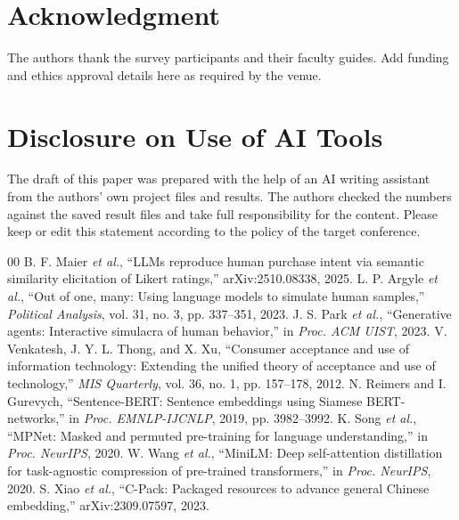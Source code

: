 \documentclass[conference]{IEEEtran}
\begin{document}
\section*{Acknowledgment}
The authors thank the survey participants and their faculty guides. Add funding and ethics approval details here as required by the venue.

\section*{Disclosure on Use of AI Tools}
The draft of this paper was prepared with the help of an AI writing assistant from the authors' own project files and results. The authors checked the numbers against the saved result files and take full responsibility for the content. Please keep or edit this statement according to the policy of the target conference.

\begin{thebibliography}{00}
 B. F. Maier \emph{et al.}, ``LLMs reproduce human purchase intent via semantic similarity elicitation of Likert ratings,'' arXiv:2510.08338, 2025.
 L. P. Argyle \emph{et al.}, ``Out of one, many: Using language models to simulate human samples,'' \emph{Political Analysis}, vol. 31, no. 3, pp. 337--351, 2023.
 J. S. Park \emph{et al.}, ``Generative agents: Interactive simulacra of human behavior,'' in \emph{Proc. ACM UIST}, 2023.
 V. Venkatesh, J. Y. L. Thong, and X. Xu, ``Consumer acceptance and use of information technology: Extending the unified theory of acceptance and use of technology,'' \emph{MIS Quarterly}, vol. 36, no. 1, pp. 157--178, 2012.
 N. Reimers and I. Gurevych, ``Sentence-BERT: Sentence embeddings using Siamese BERT-networks,'' in \emph{Proc. EMNLP-IJCNLP}, 2019, pp. 3982--3992.
 K. Song \emph{et al.}, ``MPNet: Masked and permuted pre-training for language understanding,'' in \emph{Proc. NeurIPS}, 2020.
 W. Wang \emph{et al.}, ``MiniLM: Deep self-attention distillation for task-agnostic compression of pre-trained transformers,'' in \emph{Proc. NeurIPS}, 2020.
 S. Xiao \emph{et al.}, ``C-Pack: Packaged resources to advance general Chinese embedding,'' arXiv:2309.07597, 2023.
\end{thebibliography}
\end{document}
